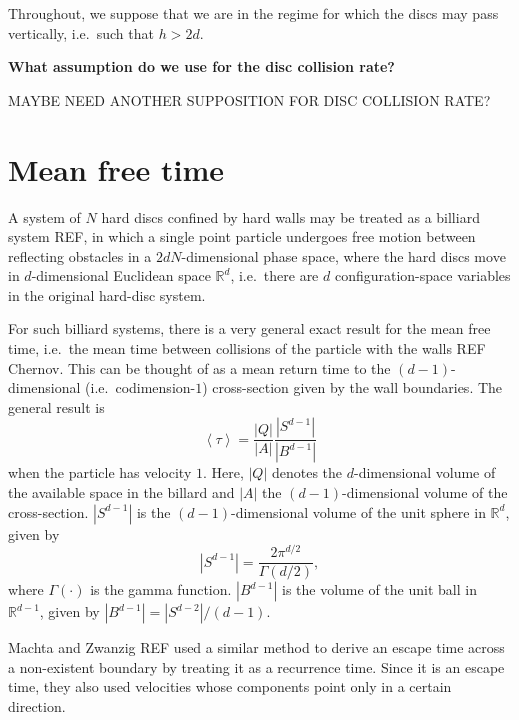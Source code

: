 \documentclass[a4paper,10pt]{article}
\newcommand{\defeq}{:=}
\newcommand{\mean}[1]{\left \langle #1 \right \rangle}
\newcommand{\RR}{\mathbb{R}}
\begin{document}

Throughout, we suppose that we are in the regime for which the discs may pass vertically, i.e.\ such that $h > 2d$.

\textbf{What assumption do we use for the disc collision rate?}

MAYBE NEED ANOTHER SUPPOSITION FOR DISC COLLISION RATE?

\section{Mean free time}
A system of $N$ hard discs confined by hard walls may be treated as a billiard system REF, in which a single point  particle undergoes free motion between reflecting obstacles in a $2dN$-dimensional phase space, where the hard discs move in $d$-dimensional Euclidean space $\RR^d$, i.e.\ there are $d$ configuration-space variables in the original hard-disc system.

For such billiard systems, there is a very general exact result for the mean free time, i.e.\ the mean time between collisions of the particle with the walls REF Chernov. This can be thought of as a mean return time to the $(d-1)$-dimensional (i.e.\ codimension-$1$) cross-section given by the wall boundaries.
The general result is
\begin{equation}
 \mean{\tau} = \frac{|Q|}{|A|} \frac{|S^{d-1}|}{|B^{d-1}|}
\end{equation}
when the particle has velocity $1$.
Here, $|Q|$ denotes the $d$-dimensional volume of the available space in the billard and $|A|$ the $(d-1)$-dimensional volume of the cross-section.
 $|S^{d-1}|$ is the $(d-1)$-dimensional volume of the unit sphere in $\RR^d$, given by
\begin{equation}
  |S^{d-1}| = \frac{2 \pi^{d/2}}{\Gamma(d/2)},
\end{equation}
where $\Gamma(\cdot)$ is the gamma function. $|B^{d-1}|$ is the volume of the unit ball in $\RR^{d-1}$, given by $|B^{d-1}| = |S^{d-2}| / (d-1)$.

Machta and Zwanzig REF used a similar method to derive an escape time across a non-existent boundary by treating it as a recurrence time.
Since it is an escape time, they also used velocities whose components point only in a certain direction.
\end{document}
